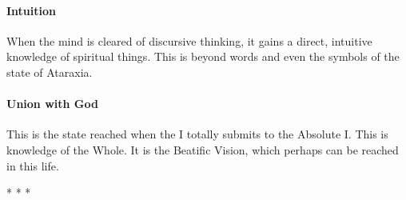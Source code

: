 \paragraph{Intuition}


When the mind is cleared of discursive thinking, it gains a direct, intuitive knowledge of spiritual things. This is beyond words and even the symbols of the state of Ataraxia.

\paragraph{Union with God}


This is the state reached when the I totally submits to the Absolute I. This is knowledge of the Whole. It is the Beatific Vision, which perhaps can be reached in this life.



\begin{center}* * *\end{center}

